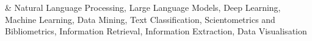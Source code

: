 %
\color{gray}{Research interests}
& Natural Language Processing, Large Language Models, Deep Learning, Machine Learning, Data Mining, Text Classification, Scientometrics and Bibliometrics, Information Retrieval, Information Extraction, Data Visualisation \\